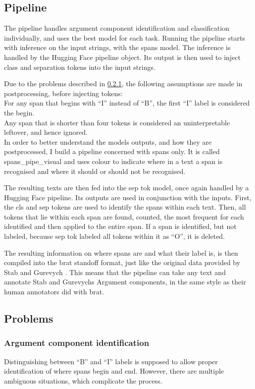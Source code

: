 \documentclass[12]{article}
\theoremstyle{mytheoremstyle}
\theoremstyle{mytheoremstyle}
\theoremstyle{myproblemstyle}
\begin{document}
  \subsection{Pipeline} \label{pipeline}
  The pipeline handles argument component identification and classification individually, and uses the best model for each task. 
  Running the pipeline starts with inference on the input strings, with the spans model. 
  The inference is handled by the Hugging Face pipeline object. 
  Its output is then used to inject class and separation tokens into the input strings. 

  Due to the problems described in \ref{aci-prob}, the following assumptions are made in postprocessing, before injecting tokens: \\
  For any span that begins with ``I'' instead of ``B'', the first ``I'' label is considered the begin. \\
  Any span that is shorter than four tokens is considered an uninterpretable leftover, and hence ignored.  \\
  In order to better understand the models outputs, and how they are postprocessed, I build a pipeline concerned with spans only. 
  It is called spans\_pipe\_visual and uses colour to indicate where in a text a span is recognised and where it should or should not be recognised.

  The resulting texts are then fed into the sep tok model, once again handled by a Hugging Face pipeline. 
  Its outputs are used in conjunction with the inputs. 
  First, the cls and sep tokens are used to identify the spans within each text. 
  Then, all tokens that lie within each span are found, counted, the most frequent for each identified and then applied to the entire span. 
  If a span is identified, but not labeled, because sep tok labeled all tokens within it as ``O'', it is deleted.

  The resulting information on where spans are and what their label is, is then compiled into the brat standoff format, just like the original data provided by Stab and Gurevych \cite{stab-gurevych-2017-parsing}. This means that the pipeline can take any text and annotate Stab and Gurevychs Argument components, in the same style as their human annotators did with brat.
  \subsection{Problems} \label{problems}
  \subsubsection{Argument component identification} \label{aci-prob}
  Distinguishing between ``B'' and ``I'' labels is supposed to allow proper identification of where spans begin and end. 
  However, there are multiple ambiguous situations, which complicate the process. 
\end{document}
